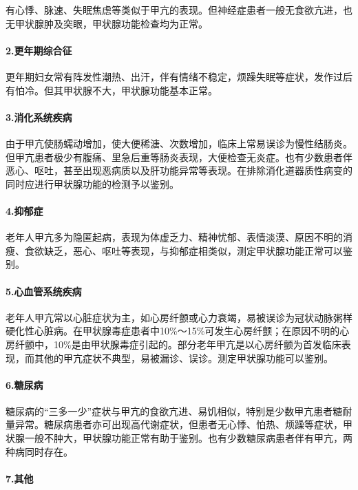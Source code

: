 有心悸、脉速、失眠焦虑等类似于甲亢的表现。但神经症患者一般无食欲亢进，也无甲状腺肿及突眼，甲状腺功能检查均为正常。

\paragraph{2.更年期综合征}

更年期妇女常有阵发性潮热、出汗，伴有情绪不稳定，烦躁失眠等症状，发作过后有怕冷。但其甲状腺不大，甲状腺功能基本正常。

\paragraph{3.消化系统疾病}

由于甲亢使肠蠕动增加，使大便稀溏、次数增加，临床上常易误诊为慢性结肠炎。但甲亢患者极少有腹痛、里急后重等肠炎表现，大便检查无炎症。也有少数患者伴恶心、呕吐，甚至出现恶病质以及肝功能异常等表现。在排除消化道器质性病变的同时应进行甲状腺功能的检测予以鉴别。

\paragraph{4.抑郁症}

老年人甲亢多为隐匿起病，表现为体虚乏力、精神忧郁、表情淡漠、原因不明的消瘦、食欲缺乏，恶心、呕吐等表现，与抑郁症相类似，测定甲状腺功能正常可以鉴别。

\paragraph{5.心血管系统疾病}

老年人甲亢常以心脏症状为主，如心房纤颤或心力衰竭，易被误诊为冠状动脉粥样硬化性心脏病。在甲状腺毒症患者中10\%～15\%可发生心房纤颤；在原因不明的心房纤颤中，10\%是由甲状腺毒症引起的。部分老年甲亢是以心房纤颤为首发临床表现，而其他的甲亢症状不典型，易被漏诊、误诊。测定甲状腺功能可以鉴别。

\paragraph{6.糖尿病}

糖尿病的“三多一少”症状与甲亢的食欲亢进、易饥相似，特别是少数甲亢患者糖耐量异常。糖尿病患者亦可出现高代谢症状，但患者无心悸、怕热、烦躁等症状，甲状腺一般不肿大，甲状腺功能正常有助于鉴别。也有少数糖尿病患者伴有甲亢，两种病同时存在。

\paragraph{7.其他}

